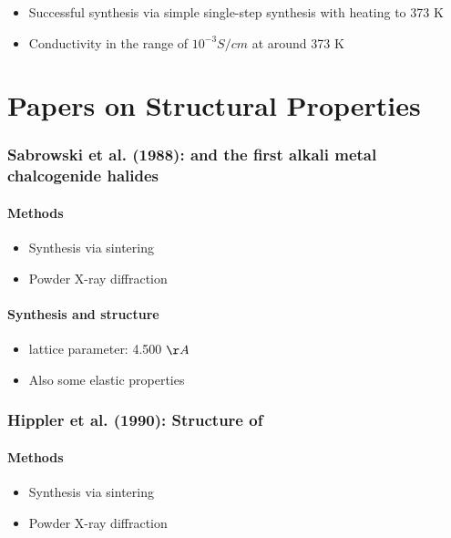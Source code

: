 \documentclass[10pt,a4paper, titlepage]{article}
\begin{document}
\begin{itemize}
  \item Successful synthesis via simple single-step synthesis with heating to 373 K
  \item Conductivity in the range of $10^{-3} S/cm$ at around 373 K
\end{itemize}

\part{Papers on Structural Properties}

\section{Sabrowski et al. (1988):  and  the first alkali metal chalcogenide halides}

\subsection{Methods}

\begin{itemize}
  \item Synthesis via sintering
  \item Powder X-ray diffraction
\end{itemize}

\subsection{Synthesis and structure}

\begin{itemize}
  \item {} lattice parameter: 4.500 $\AA$
  \item Also some elastic properties
\end{itemize}

\section{Hippler et al. (1990): Structure of }

\subsection{Methods}

\begin{itemize}
  \item Synthesis via sintering
  \item Powder X-ray diffraction
\end{itemize}
\end{document}
